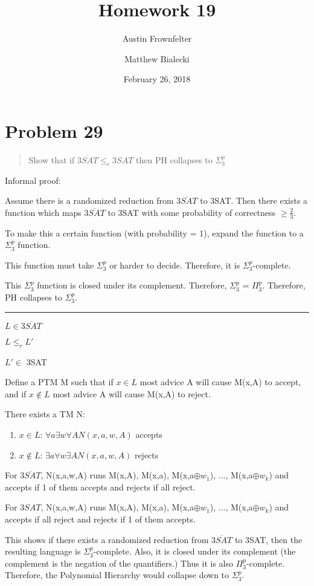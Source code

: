 \documentclass{article}
\title{Homework 19}
\author{Austin Frownfelter \and Matthew Bialecki}
\date{February 26, 2018}
\begin{document}
\maketitle

\section{Problem 29}
\begin{quote}
Show that if $\overline{3SAT} \leq _{r} 3SAT$ then PH collapses to $\Sigma_3^p$
\end{quote}

Informal proof:

Assume there is a randomized reduction from $\overline{3SAT}$ to 3SAT.  Then there exists a function which maps $\overline{3SAT}$ to 3SAT with some probability of correctness $\geq \frac23$.

To make this a certain function (with probability = 1), expand the function to a $\Sigma_3^p$ function.

This function must take $\Sigma_3^p$ or harder to decide.  Therefore, it is $\Sigma_3^p$-complete.

This $\Sigma_3^p$ function is closed under its complement.  Therefore, $\Sigma_3^p$ = $\Pi_3^p$.  Therefore, PH collapses to $\Sigma_3^p$.

\noindent\rule{\linewidth}{1pt}

$L \in \overline{3SAT}$

$L \leq _r L'$

$L' \in $ 3SAT

Define a PTM M such that if $x\in L$ most advice A will cause M(x,A) to accept, and if $x\notin L$ most advice A will cause M(x,A) to reject.

\medskip
There exists a TM N:
\begin{enumerate}[label=]
\item $x\in L$: $ \forall a\exists w\forall A N(x,a,w,A)$ accepts
\item $x\notin L$: $ \exists a\forall w\exists A N(x,a,w,A)$ rejects
\end{enumerate}

For $\overline{3SAT}$, N(x,a,w,A) runs M(x,A), M(x,a), M(x,a$\oplus w_1$), ..., M(x,a$\oplus w_k$) and accepts if 1 of them accepts and rejects if all reject.

For $3SAT$, N(x,a,w,A) runs M(x,A), M(x,a), M(x,a$\oplus w_1$), ..., M(x,a$\oplus w_k$) and accepts if all reject and rejects if 1 of them accepts.

This shows if there exists a randomized reduction from $\overline{3SAT}$ to 3SAT, then the resulting language is $\Sigma_3^p$-complete.  Also, it is closed under its complement (the complement is the negation of the quantifiers.) Thus it is also $\Pi_3^p$-complete.  Therefore, the Polynomial Hierarchy would collapse down to $\Sigma_3^p$.
\end{document}
